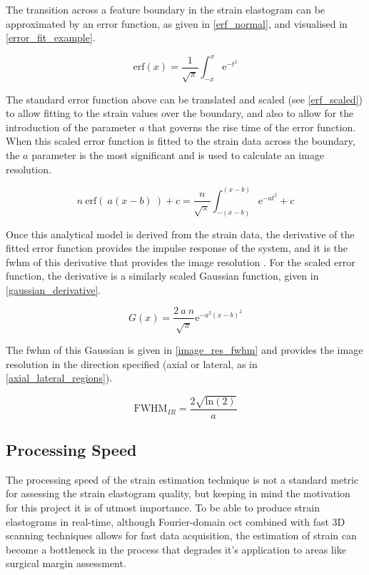 The transition across a feature boundary in the strain elastogram can be approximated by an error function, as given in \autoref{erf_normal}, and visualised in \autoref{error_fit_example}. 

\begin{equation}
	\text{erf}(x)=\frac{1}{\sqrt{\pi}} \int_{-x}^{x} \text{e}^{-t^2}
	\label{erf_normal}
\end{equation}

The standard error function above can be translated and scaled (see \autoref{erf_scaled}) to allow fitting to the strain values over the boundary, and also to allow for the introduction of the parameter $a$ that governs the rise time of the error function. When this scaled error function is fitted to the strain data across the boundary, the $a$ parameter is the most significant and is used to calculate an image resolution.

\begin{equation}
	n \: \text{erf}(\:a(x-b)\:) + c = \frac{n}{\sqrt{\pi}} \int_{-(x-b)}^{(x-b)} \text{e}^{-a t^2} + c
	\label{erf_scaled}
\end{equation}

Once this analytical model is derived from the strain data, the derivative of the fitted error function provides the impulse response of the system, and it is the \ac{fwhm} of this derivative that provides the image resolution \cite{hepburn_improving_2017}. For the scaled error function, the derivative is a similarly scaled Gaussian function, given in \autoref{gaussian_derivative}.

\begin{equation}
	G(x) = \frac{2\:a\:n}{\sqrt{\pi}} \text{e}^{-a^2 (x-b)^2}
	\label{gaussian_derivative}
\end{equation}

The \ac{fwhm} of this Gaussian is given in \autoref{image_res_fwhm} and provides the image resolution in the direction specified (axial or lateral, as in \autoref{axial_lateral_regions}).

\begin{equation}
	\text{FWHM}_{IR} = \frac{2 \sqrt{\text{ln}(2)}}{a}
	\label{image_res_fwhm}
\end{equation}

\subsection{Processing Speed}
The processing speed of the strain estimation technique is not a standard metric for assessing the strain elastogram quality, but keeping in mind the motivation for this project it is of utmost importance. To be able to produce strain elastograms in real-time, although Fourier-domain \ac{oct} combined with fast 3D scanning techniques allows for fast data acquisition, the estimation of strain can become a bottleneck in the process that degrades it's application to areas like surgical margin assessment.

